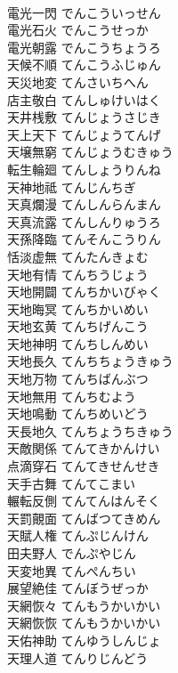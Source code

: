 \documentclass[8pt]{extreport}
\begin{document}
\begin{CJK}{UTF8}{min}
\\	電光一閃	でんこういっせん	
\\	電光石火	でんこうせっか	
\\	電光朝露	でんこうちょうろ	
\\	天候不順	てんこうふじゅん	
\\	天災地変	てんさいちへん	
\\	店主敬白	てんしゅけいはく	
\\	天井桟敷	てんじょうさじき	
\\	天上天下	てんじょうてんげ	
\\	天壌無窮	てんじょうむきゅう	
\\	転生輪廻	てんしょうりんね	
\\	天神地祗	てんじんちぎ	
\\	天真爛漫	てんしんらんまん	
\\	天真流露	てんしんりゅうろ	
\\	天孫降臨	てんそんこうりん	
\\	恬淡虚無	てんたんきょむ	
\\	天地有情	てんちうじょう	
\\	天地開闢	てんちかいびゃく	
\\	天地晦冥	てんちかいめい	
\\	天地玄黄	てんちげんこう	
\\	天地神明	てんちしんめい	
\\	天地長久	てんちちょうきゅう	
\\	天地万物	てんちばんぶつ	
\\	天地無用	てんちむよう	
\\	天地鳴動	てんちめいどう	
\\	天長地久	てんちょうちきゅう	
\\	天敵関係	てんてきかんけい	
\\	点滴穿石	てんてきせんせき	
\\	天手古舞	てんてこまい	
\\	輾転反側	てんてんはんそく	
\\	天罰覿面	てんばつてきめん	
\\	天賦人権	てんぷじんけん	
\\	田夫野人	でんぷやじん	
\\	天変地異	てんぺんちい	
\\	展望絶佳	てんぼうぜっか	
\\	天網恢々	てんもうかいかい	
\\	天網恢恢	てんもうかいかい	
\\	天佑神助	てんゆうしんじょ	
\\	天理人道	てんりじんどう	

\end{CJK}
\end{document}
